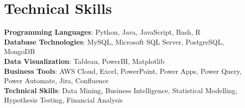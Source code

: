 \documentclass[letterpaper,11pt]{article}
\begin{document}
\section{Technical Skills}
\begin{itemize}[leftmargin=0.15in, label={}]
    \small{\item{
    \textbf{Programming Languages}{: Python, Java, JavaScript, Bash, R} \\
    \textbf{Database Technologies}{: MySQL, Microsoft SQL Server, PostgreSQL, MongoDB} \\
    \textbf{Data Visualization}{: Tableau, PowerBI, Matplotlib} \\
    \textbf{Business Tools}{: AWS Cloud, Excel, PowerPoint, Power Apps, Power Query, Power Automate, Jira, Confluence} \\
    \textbf{Technical Skills}{: Data Mining, Business Intelligence, Statistical Modelling, Hypothesis Testing, Financial Analysis} \\
    }}
\end{itemize}
\vspace{-16pt}
\end{document}
